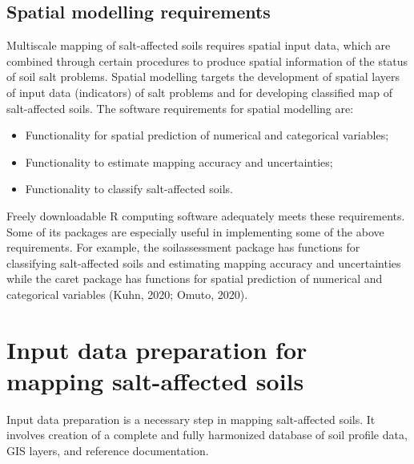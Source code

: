 \documentclass[
  10pt,
  b5paper,
]{book}
\providecommand{\tightlist}{%
  \setlength{\itemsep}{0pt}\setlength{\parskip}{0pt}}
\begin{document}
\hypertarget{spatial-modelling-requirements}{%
\subsection{Spatial modelling requirements}\label{spatial-modelling-requirements}}

Multiscale mapping of salt-affected soils requires spatial input data, which are combined through certain procedures to produce spatial information of the status of soil salt problems. Spatial modelling targets the development of spatial layers of input data (indicators) of salt problems and for developing classified map of salt-affected soils. The software requirements for spatial modelling are:

\begin{itemize}
\tightlist
\item
  Functionality for spatial prediction of numerical and categorical variables;\\
\item
  Functionality to estimate mapping accuracy and uncertainties;\\
\item
  Functionality to classify salt-affected soils.
\end{itemize}

Freely downloadable R computing software adequately meets these requirements. Some of its packages are especially useful in implementing some of the above requirements. For example, the soilassessment package has functions for classifying salt-affected soils and estimating mapping accuracy and uncertainties while the caret package has functions for spatial prediction of numerical and categorical variables (Kuhn, 2020; Omuto, 2020).

\hypertarget{input-data-preparation-for-mapping-salt-affected-soils}{%
\section{Input data preparation for mapping salt-affected soils}\label{input-data-preparation-for-mapping-salt-affected-soils}}

Input data preparation is a necessary step in mapping salt-affected soils. It involves creation of a complete and fully harmonized database of soil profile data, GIS layers, and reference documentation.
\end{document}
